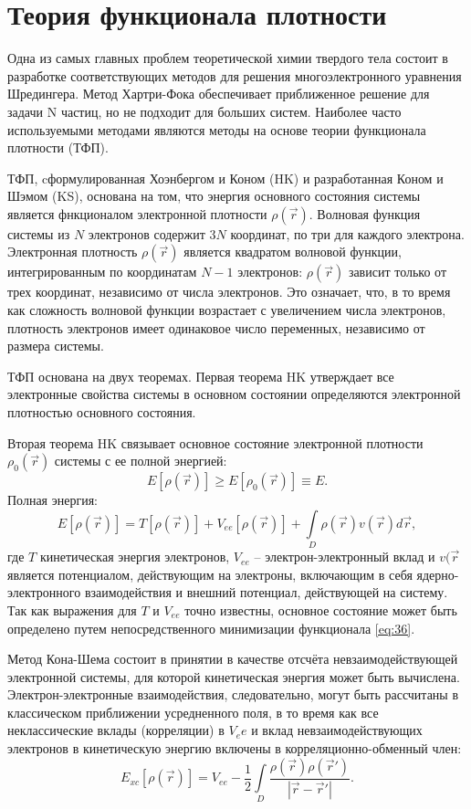 \chapter{Теория функционала плотности}
Одна из самых главных проблем теоретической химии твердого тела состоит в разработке соответствующих методов для решения многоэлектронного уравнения Шредингера. Метод Хартри-Фока обеспечивает приближенное решение для задачи N частиц, но не подходит для больших систем. Наиболее часто используемыми методами являются методы на основе теории функционала плотности (ТФП).

ТФП, cформулированная Хоэнбергом и Коном (HK) и разработанная Коном и Шэмом (KS), основана на том, что энергия основного состояния системы является фнкционалом электронной плотности \(\rho(\vec{r})\). Волновая функция системы из \(N\) электронов содержит \(3N\) координат, по три для каждого электрона. Электронная плотность \(\rho(\vec{r})\) является квадратом волновой функции, интегрированным по координатам \(N-1\) электронов: \(\rho(\vec{r})\) зависит только от трех координат, независимо от числа электронов. Это означает, что, в то время как сложность волновой функции возрастает с увеличением числа электронов, плотность электронов имеет одинаковое число переменных, независимо от размера системы.

ТФП основана на двух теоремах. Первая теорема HK утверждает все электронные свойства системы в основном состоянии определяются электронной плотностью основного состояния.

Вторая теорема HK связывает основное состояние электронной плотности \(\rho_0(\vec{r})\) системы с ее полной энергией:
\begin{equation}
    E[\rho(\vec{r})] \ge E[\rho_0(\vec{r})] \equiv E.
\end{equation}
Полная энергия:
\begin{equation}
    E[\rho(\vec{r})] = T[\rho(\vec{r})] + V_{ee}[\rho(\vec{r})]+
    \int\limits_D \rho(\vec{r}) v(\vec{r}) d\vec{r},
    \label{eq:36}
\end{equation}
где \(T\) кинетическая энергия электронов, \(V_{ee}\) -- электрон-электронный вклад и \(v(\vec{r}\) является потенциалом, действующим на электроны, включающим в себя ядерно-электронного взаимодействия и внешний потенциал, действующей на систему. Так как выражения для \( T \) и \(V_{ee}\) точно известны, основное состояние может быть определено путем непосредственного минимизации функционала \eqref{eq:36}.

Метод Кона-Шема состоит в принятии в качестве отсчёта невзаимодействующей электронной системы, для которой кинетическая энергия может быть вычислена. Электрон-электронные взаимодействия, следовательно, могут быть рассчитаны в классическом  приближении усредненного поля, в то время как все неклассические вклады (корреляции) в \(V_ee\) и вклад невзаимодействующих электронов в кинетическую энергию включены в корреляционно-обменный член:
\begin{equation}
    E_{xc}[\rho(\vec{r})] = V_{ee} - \frac{1}{2}\int\limits_{D}\frac{\rho(\vec{r})\rho(\vec{r}')}{|\vec{r} - \vec{r}'|}.
    \label{eq:37}
\end{equation}

